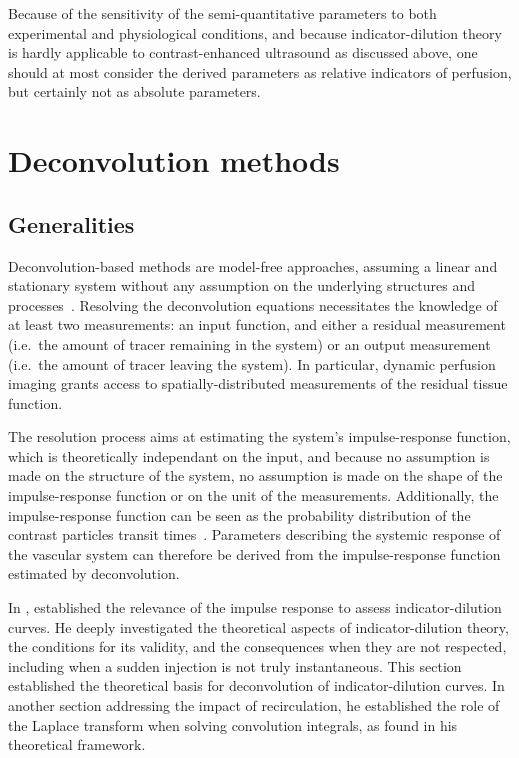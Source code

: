 Because of the sensitivity of the semi-quantitative parameters to both experimental and physiological conditions, and because indicator-dilution theory is hardly applicable to contrast-enhanced ultrasound as discussed above, one should at most consider the derived parameters as relative indicators of perfusion, but certainly not as absolute parameters.

\section{Deconvolution methods}
\label{sec:DeconvolutionMethods}
\subsection{Generalities}
Deconvolution-based methods are model-free approaches, assuming a linear and stationary system without any assumption on the underlying structures and processes~\cite{Lassen:1979tk}.
Resolving the deconvolution equations necessitates the knowledge of at least two measurements: an input function, and either a residual measurement (i.e.~the amount of tracer remaining in the system) or an output measurement (i.e.~the amount of tracer leaving the system).
In particular, dynamic perfusion imaging grants access to spatially-distributed measurements of the residual tissue function.

The resolution process aims at estimating the system's impulse-response function, which is theoretically independant on the input, and because no assumption is made on the structure of the system, no assumption is made on the shape of the impulse-response function or on the unit of the measurements.
Additionally, the impulse-response function can be seen as the probability distribution of the contrast particles transit times~\cite{Lassen:1979vj}.
Parameters describing the systemic response of the vascular system can therefore be derived from the impulse-response function estimated by deconvolution.

In \citeyear{Zierler:1962cx}, \citet{Zierler:1962cx} established the relevance of the impulse response to assess indicator-dilution curves.
He deeply investigated the theoretical aspects of indicator-dilution theory, the conditions for its validity, and the consequences when they are not respected, including when a sudden injection is not truly instantaneous. 
This section established the theoretical basis for deconvolution of indicator-dilution curves. 
In another section addressing the impact of recirculation, he established the role of the Laplace transform when solving convolution integrals, as found in his theoretical framework.

